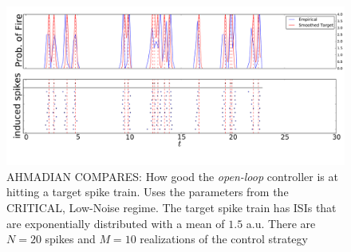 \documentclass[12pt]{iopart}
\begin{document}
\begin{figure}[htp]
\begin{center}
  \includegraphics[width=.99\textwidth]{Figs/TrainController/CRITLN_Ahmadian_ol_trains_sim_10.pdf}
  \caption[ ]{AHMADIAN COMPARES: How good the {\sl open-loop} controller is at
  hitting a target spike train. Uses the parameters from the CRITICAL, Low-Noise
  regime. The target spike train has ISIs that are exponentially distributed with a
  mean of $1.5$ a.u. There are $N=20$ spikes and $M=10$ realizations of the
  control strategy}
  \label{fig:targettrain_ol_critlownoise}
\end{center}
\end{figure}
\end{document}
